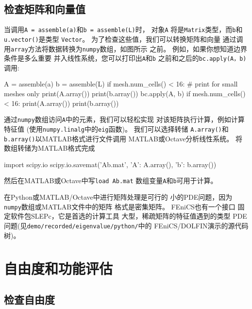 \subsection{检查矩阵和向量值}

当调用\texttt{A = assemble(a)}和\texttt{b = assemble(L)}时，
对象\texttt{A}
将是\texttt{Matrix}类型，而\texttt{b}和\texttt{u.vector()}是类型
\texttt{Vector}。 为了检查这些值，我们可以转换矩阵和向量
通过调用\texttt{array}方法将数据转换为\texttt{numpy}数组，如图所示
之前。 例如，如果你想知道边界条件是多么重要
并入线性系统，您可以打印出\texttt{A}和\texttt{b}
之前和之后的\texttt{bc.apply(A，b)}调用:

\begin{python}
A = assemble(a)
b = assemble(L)
if mesh.num_cells() < 16:  # print for small meshes only
    print(A.array())
    print(b.array())
bc.apply(A, b)
if mesh.num_cells() < 16:
    print(A.array())
    print(b.array())
\end{python}

通过\texttt{numpy}数组访问\texttt{A}中的元素，我们可以轻松实现
对该矩阵执行计算，例如计算特征值
(使用\texttt{numpy.linalg}中的\texttt{eig}函数)。 我们可以选择转储
\texttt{A.array()}和\texttt{b.array()}以MATLAB格式进行文件调用
MATLAB或Octave分析线性系统。
将数组转储为MATLAB格式完成


\begin{python}
import scipy.io
scipy.io.savemat('Ab.mat', {'A': A.array(), 'b': b.array()})
\end{python}
然后在MATLAB或Octave中写\texttt{load Ab.mat}
数组变量\texttt{A}和\texttt{b}可用于计算。


在Python或MATLAB/Octave中进行矩阵处理是可行的
小的PDE问题，因为\texttt{numpy}数组或MATLAB文件中的矩阵
格式是密集矩阵。 FEniCS也有一个接口
固定软件包SLEPc，它是首选的计算工具
大型，稀疏矩阵的特征值遇到的类型
PDE问题(见\texttt{demo/recorded/eigenvalue/python/}中的
FEniCS/DOLFIN演示的源代码树)。

\section{自由度和功能评估}

\subsection{检查自由度}
\label{ch:poisson0:verify1}


